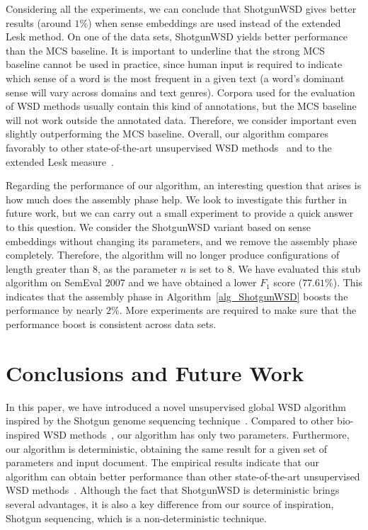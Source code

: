 \documentclass[11pt]{article}
\begin{document}
Considering all the experiments, we can conclude that ShotgunWSD gives better results (around $1\%$) when sense embeddings are used instead of the extended Lesk method. On one of the data sets, ShotgunWSD yields better performance than the MCS baseline. It is important to underline that the strong MCS baseline cannot be used in practice, since human input is required to indicate which sense of a word is the most frequent in a given text (a word's dominant sense will vary across domains and text genres). Corpora used for the evaluation of WSD methods usually contain this kind of annotations, but the MCS baseline will not work outside the annotated data. Therefore, we consider important even slightly outperforming the MCS baseline. Overall, our algorithm compares favorably to other state-of-the-art unsupervised WSD methods~\cite{Schwab-WET-2013,Chen-EMNLP-2014,Bhingardive-NAACL-2015} and to the extended Lesk measure~\cite{Banerjee-CICLING-2002,Torres-Lesk-2009}.

Regarding the performance of our algorithm, an interesting question that arises is how much does the assembly phase help. We look to investigate this further in future work, but we can carry out a small experiment to provide a quick answer to this question. We consider the ShotgunWSD variant based on sense embeddings without changing its parameters, and we remove the assembly phase completely. Therefore, the algorithm will no longer produce configurations of length greater than $8$, as the parameter $n$ is set to $8$. We have evaluated this stub algorithm on SemEval 2007 and we have obtained a lower $F_1$ score ($77.61\%$). This indicates that the assembly phase in Algorithm~\ref{alg_ShotgunWSD} boosts the performance by nearly $2\%$. More experiments are required to make sure that the performance boost is consistent across data sets.

\section{Conclusions and Future Work}
\label{sec_Conclusions}

In this paper, we have introduced a novel unsupervised global WSD algorithm inspired by the Shotgun genome sequencing technique~\cite{Shotgun-1981}. Compared to other bio-inspired WSD methods~\cite{Schwab-COLING-2012,Schwab-WET-2013}, our algorithm has only two parameters. Furthermore, our algorithm is deterministic, obtaining the same result for a given set of parameters and input document. The empirical results indicate that our algorithm can obtain better performance than other state-of-the-art unsupervised WSD methods~\cite{Schwab-WET-2013,Chen-EMNLP-2014,Bhingardive-NAACL-2015}. Although the fact that ShotgunWSD is deterministic brings several advantages, it is also a key difference from our source of inspiration, Shotgun sequencing, which is a non-deterministic technique.
\end{document}

